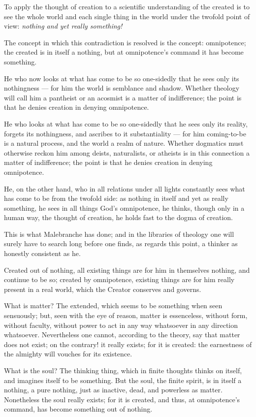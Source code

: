 \documentclass[12pt,a4paper]{article}
\begin{document}
To apply the thought of creation to a scientific understanding of the created is to
see the whole world and each single thing in the world under the twofold point of
view: \emph{nothing and yet really something!}

The concept in which this contradiction is resolved is the concept: omnipotence;
the created is in
itself a nothing, but at omnipotence's command it has become something.

He who now looks at what has come to be so one-sidedly that he sees only its
nothingness --- for him the world is semblance and shadow. Whether theology will
call him a pantheist or an acosmist is a matter of indifference; the point is that
he denies creation in denying omnipotence.

He who looks at what has come to be so one-sidedly that he sees only its reality,
forgets its nothingness, and ascribes to it substantiality --- for him
coming-to-be is a natural process, and the world a realm of nature. Whether
dogmatics must otherwise reckon him among deists, naturalists, or atheists is in
this connection a matter of indifference; the point is that he denies creation in
denying omnipotence.

He, on the other hand, who in all relations under all lights constantly sees what
has come to be from the twofold side: as nothing in itself and yet as really
something, he sees in all things God's omnipotence, he thinks, though only in a
human way, the thought of creation, he holds fast to the dogma of creation.

This is what Malebranche has done; and in the libraries of theology one will surely
have to search long before one finds, as regards this point, a thinker as honestly
consistent as he.

Created out of nothing, all existing things are for him in themselves nothing, and
continue
to be so; created by omnipotence, existing things are for him really present in a
real world, which the Creator conserves and governs.

What is matter? The extended, which seems to be something when seen sensuously;
but, seen with the eye of reason, matter is essenceless, without form, without
faculty, without power to act in any way whatsoever in any direction whatsoever.
Nevertheless one cannot, according to the theory, say that matter does not exist;
on the contrary! it really exists; for it is created: the earnestness of the
almighty will vouches for its existence.

What is the soul? The thinking thing, which in finite thoughts thinks on itself,
and imagines itself to be something. But the soul, the finite spirit, is in itself
a nothing, a pure nothing, just as inactive, dead, and powerless as matter.
Nonetheless the soul really exists; for it is created, and thus, at omnipotence's
command, has become something out of nothing.
\end{document}
